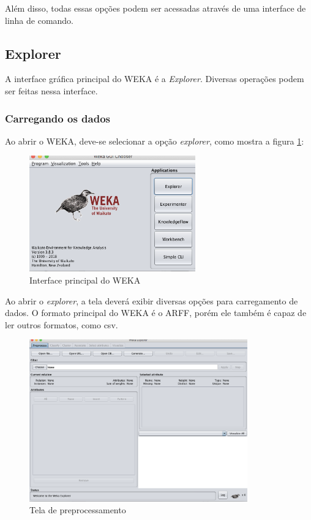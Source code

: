 Além disso, todas essas opções podem ser acessadas através de uma interface de linha de comando.

\subsection{Explorer}
A interface gráfica principal do WEKA é a \textit{Explorer}. Diversas operações podem ser feitas nessa interface.

\subsubsection{Carregando os dados}
Ao abrir o WEKA, deve-se selecionar a opção \textit{explorer}, como mostra a figura \ref{explorer}:

\begin{figure}[H]
\centering
\includegraphics[height=5cm]{imagens/wekaprincipal.png}
\caption{Interface principal do WEKA}
\label{explorer}
\end{figure}

Ao abrir o \textit{explorer}, a tela deverá exibir diversas opções para carregamento de dados. O formato principal do WEKA é o ARFF, porém ele também é capaz de ler outros formatos, como csv.

\begin{figure}[H]
\centering
\includegraphics[height=7cm]{imagens/wekapreprocessempty.png}
\caption{Tela de preprocessamento}
\label{figura19}
\end{figure}

